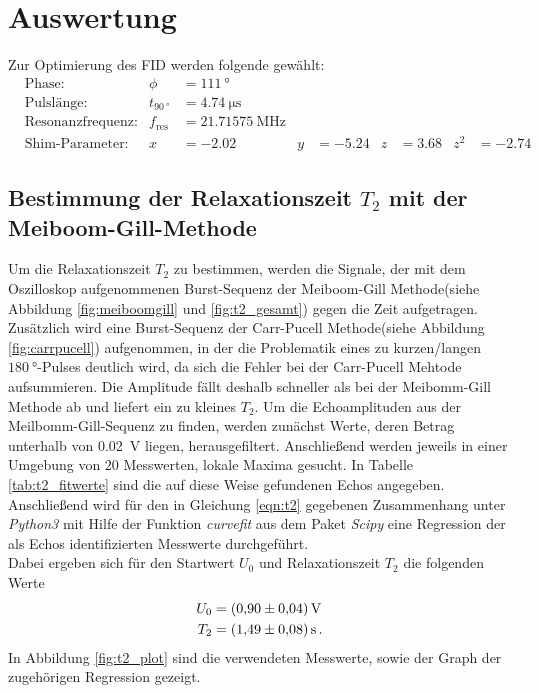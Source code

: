 \newpage
\section{Auswertung}
\label{sec:Auswertung}

Zur Optimierung des FID werden folgende gewählt:
\begin{align}
&\text{Phase:} & \phi&= \SI{111}{\degree}\\
&\text{Pulslänge:} & t_{\SI{90}{\degree}}& =  \SI{4.74}{\micro\second}\\
&\text{Resonanzfrequenz:} & f_{\text{res}}&= \SI{21.71575}{\mega\hertz}\\
&\text{Shim-Parameter:} & x&=\num{-2.02} & y&=\num{-5.24} & z&=\num{3.68} & z^2&=\num{-2.74}
\end{align}

\subsection{Bestimmung der Relaxationszeit $T_{2}$ mit der Meiboom-Gill-Methode}
\label{subsec:T2}
Um die Relaxationszeit $T_{2}$ zu bestimmen, werden die Signale, der mit dem Oszilloskop aufgenommenen
Burst-Sequenz der Meiboom-Gill Methode(siehe Abbildung \ref{fig:meiboomgill} und \ref{fig:t2_gesamt}) gegen die Zeit aufgetragen.
Zusätzlich wird eine Burst-Sequenz der Carr-Pucell Methode(siehe Abbildung \ref{fig:carrpucell}) aufgenommen, in der die
Problematik eines zu kurzen/langen $\SI{180}{\degree}$-Pulses deutlich wird, da
sich die Fehler bei der Carr-Pucell Mehtode aufsummieren.
Die Amplitude fällt deshalb schneller als bei der Meibomm-Gill Methode
ab und liefert ein zu kleines $T_2$.
Um die Echoamplituden aus der Meilbomm-Gill-Sequenz zu finden, werden
zunächst Werte, deren Betrag unterhalb von \SI{0.02}{\volt} liegen, herausgefiltert.
Anschließend werden jeweils in einer Umgebung von $20$ Messwerten, lokale
Maxima gesucht.
In Tabelle \ref{tab:t2_fitwerte}
sind die auf diese Weise gefundenen Echos angegeben.
Anschließend wird für den in Gleichung \eqref{eqn:t2} gegebenen Zusammenhang unter \textit{Python3} mit Hilfe der Funktion \textit{curvefit} aus
dem Paket \textit{Scipy} eine Regression der als Echos identifizierten Messwerte durchgeführt.\\
Dabei ergeben sich für den Startwert $U_{0}$ und Relaxationszeit $T_{2}$ die folgenden Werte
\begin{align*}
  U_{0} &= \SI{0.90+-0.04}{\volt} \\
  T_{2} &= \SI{1.49+-0.08}{\second} \, .
\end{align*}
In Abbildung \ref{fig:t2_plot} sind die verwendeten Messwerte, sowie der Graph der zugehörigen Regression
gezeigt.\\


